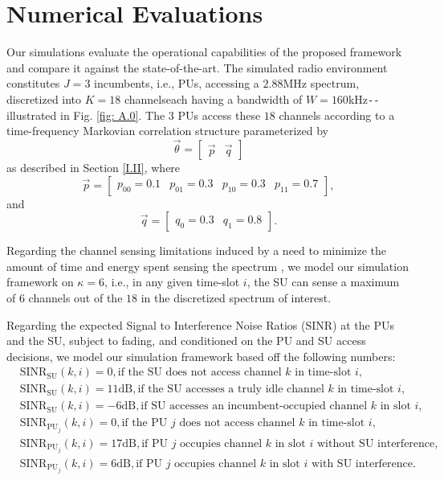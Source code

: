\documentclass[12pt, draftcls, onecolumn]{IEEEtran}
\begin{document}
\section{Numerical Evaluations}\label{III}
Our simulations evaluate the operational capabilities of the proposed framework and compare it against the state-of-the-art. The simulated radio environment constitutes $J{=}3$ incumbents, i.e., PUs, accessing a $2.88$MHz spectrum, discretized into $K{=}18$ channels\text{-}each having a bandwidth of $W{=}160$kHz\texttt{-{}-}illustrated in Fig. \ref{fig: A.0}. The $3$ PUs access these $18$ channels according to a time-frequency Markovian correlation structure parameterized by
\[\vec{\theta}=\begin{bmatrix}
                    \vec{p} & \vec{q}
               \end{bmatrix}\]
as described in Section \ref{I.II}, where
\[\vec{p}=\begin{bmatrix}
            p_{00}=0.1 & p_{01}=0.3 & p_{10}=0.3 & p_{11}=0.7
          \end{bmatrix},\]
and
\[\vec{q}=\begin{bmatrix}
            q_{0}=0.3 & q_{1}=0.8
          \end{bmatrix}.\]

Regarding the channel sensing limitations induced by a need to minimize the amount of time and energy spent sensing the spectrum \cite{WCL:3}, we model our simulation framework on $\kappa{=}6$, i.e., in any given time-slot $i$, the SU can sense a maximum of $6$ channels out of the $18$ in the discretized spectrum of interest.

Regarding the expected Signal to Interference Noise Ratios (SINR) at the PUs and the SU, subject to fading, and conditioned on the PU and SU access decisions, we model our simulation framework based off the following numbers:
\begin{align*}
    &\text{SINR}_{\text{SU}}(k,i){=}0,\text{if the SU does not access channel $k$ in time-slot $i$,}\\
    &\text{SINR}_{\text{SU}}(k,i){=}11\text{dB},\text{if the SU accesses a truly idle channel $k$ in time-slot $i$,}\\
    &\text{SINR}_{\text{SU}}(k,i){=}-6\text{dB},\text{if SU accesses an incumbent-occupied channel $k$ in slot $i$,}\\
    &\text{SINR}_{\text{PU}_{j}}(k,i){=}0,\text{if the PU $j$ does not access channel $k$ in time-slot $i$,}\\
    &\text{SINR}_{\text{PU}_{j}}(k,i){=}17\text{dB},\text{if PU $j$ occupies channel $k$ in slot $i$ without SU interference,}\\
    &\text{SINR}_{\text{PU}_{j}}(k,i){=}6\text{dB},\text{if PU $j$ occupies channel $k$ in slot $i$ with SU interference.}
\end{align*}
\end{document}
